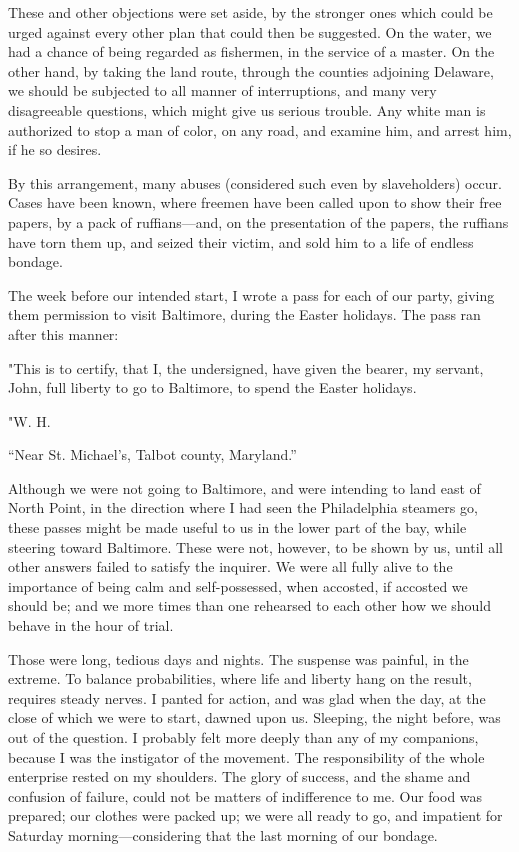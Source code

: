 These and other objections were set aside, by the stronger ones which
could be urged against every other plan that could then be suggested. On
the water, we had a chance of being regarded as fishermen, in the
service of a master. On the other hand, by taking the land route,
through the counties adjoining Delaware, we should be subjected to all
manner of interruptions, and many very disagreeable questions, which
might give us serious trouble. Any white man is authorized to stop a man
of color, on any road, and examine him, and arrest him, if he so
desires.

By this arrangement, many abuses (considered such even by slaveholders)
occur. Cases have been known, where freemen have been called upon to
show their free papers, by a pack of ruffians---and, on the presentation
of the papers, the ruffians have torn them up, and seized their victim,
and sold him to a life of endless bondage.

The week before our intended start, I wrote a pass for each of our
party, giving them permission to visit Baltimore, during the Easter
holidays. The pass ran after this manner:
{\protect\hypertarget{287}{}{}}

"This is to certify, that I, the undersigned, have given the bearer, my
servant, John, full liberty to go to Baltimore, to spend the Easter
holidays.

"W. H.

{``Near St. Michael's, Talbot county, Maryland.''}

Although we were not going to Baltimore, and were intending to land east
of North Point, in the direction where I had seen the Philadelphia
steamers go, these passes might be made useful to us in the lower part
of the bay, while steering toward Baltimore. These were not, however, to
be shown by us, until all other answers failed to satisfy the inquirer.
We were all fully alive to the importance of being calm and
self-possessed, when accosted, if accosted we should be; and we more
times than one rehearsed to each other how we should behave in the hour
of trial.

Those were long, tedious days and nights. The suspense was painful, in
the extreme. To balance probabilities, where life and liberty hang on
the result, requires steady nerves. I panted for action, and was glad
when the day, at the close of which we were to start, dawned upon us.
Sleeping, the night before, was out of the question. I probably felt
more deeply than any of my companions, because I was the instigator of
the movement. The responsibility of the whole enterprise rested on my
shoulders. The glory of success, and the shame and confusion of failure,
could not be matters of indifference to me. Our food was prepared; our
clothes were packed up; we were all ready to go, and impatient for
Saturday morning---considering that the last morning of our bondage.

